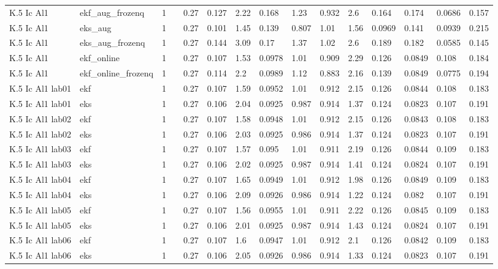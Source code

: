 \begin{table}[t]
\begin{tabular}{lllllllllllllll}
K.5 Ic Al1 & ekf\_aug\_frozenq & 1 &  & 0.27 & 0.127 & 2.22 & 0.168 & 1.23 & 0.932 & 2.6 & 0.164 & 0.174 & 0.0686 & 0.157 \\
K.5 Ic Al1 & eks\_aug & 1 &  & 0.27 & 0.101 & 1.45 & 0.139 & 0.807 & 1.01 & 1.56 & 0.0969 & 0.141 & 0.0939 & 0.215 \\
K.5 Ic Al1 & eks\_aug\_frozenq & 1 &  & 0.27 & 0.144 & 3.09 & 0.17 & 1.37 & 1.02 & 2.6 & 0.189 & 0.182 & 0.0585 & 0.145 \\
K.5 Ic Al1 & ekf\_online & 1 &  & 0.27 & 0.107 & 1.53 & 0.0978 & 1.01 & 0.909 & 2.29 & 0.126 & 0.0849 & 0.108 & 0.184 \\
K.5 Ic Al1 & ekf\_online\_frozenq & 1 &  & 0.27 & 0.114 & 2.2 & 0.0989 & 1.12 & 0.883 & 2.16 & 0.139 & 0.0849 & 0.0775 & 0.194 \\
K.5 Ic Al1 lab01 & ekf & 1 &  & 0.27 & 0.107 & 1.59 & 0.0952 & 1.01 & 0.912 & 2.15 & 0.126 & 0.0844 & 0.108 & 0.183 \\
K.5 Ic Al1 lab01 & eks & 1 &  & 0.27 & 0.106 & 2.04 & 0.0925 & 0.987 & 0.914 & 1.37 & 0.124 & 0.0823 & 0.107 & 0.191 \\
K.5 Ic Al1 lab02 & ekf & 1 &  & 0.27 & 0.107 & 1.58 & 0.0948 & 1.01 & 0.912 & 2.15 & 0.126 & 0.0843 & 0.108 & 0.183 \\
K.5 Ic Al1 lab02 & eks & 1 &  & 0.27 & 0.106 & 2.03 & 0.0925 & 0.986 & 0.914 & 1.37 & 0.124 & 0.0823 & 0.107 & 0.191 \\
K.5 Ic Al1 lab03 & ekf & 1 &  & 0.27 & 0.107 & 1.57 & 0.095 & 1.01 & 0.911 & 2.19 & 0.126 & 0.0844 & 0.109 & 0.183 \\
K.5 Ic Al1 lab03 & eks & 1 &  & 0.27 & 0.106 & 2.02 & 0.0925 & 0.987 & 0.914 & 1.41 & 0.124 & 0.0824 & 0.107 & 0.191 \\
K.5 Ic Al1 lab04 & ekf & 1 &  & 0.27 & 0.107 & 1.65 & 0.0949 & 1.01 & 0.912 & 1.98 & 0.126 & 0.0849 & 0.109 & 0.183 \\
K.5 Ic Al1 lab04 & eks & 1 &  & 0.27 & 0.106 & 2.09 & 0.0926 & 0.986 & 0.914 & 1.22 & 0.124 & 0.082 & 0.107 & 0.191 \\
K.5 Ic Al1 lab05 & ekf & 1 &  & 0.27 & 0.107 & 1.56 & 0.0955 & 1.01 & 0.911 & 2.22 & 0.126 & 0.0845 & 0.109 & 0.183 \\
K.5 Ic Al1 lab05 & eks & 1 &  & 0.27 & 0.106 & 2.01 & 0.0925 & 0.987 & 0.914 & 1.43 & 0.124 & 0.0824 & 0.107 & 0.191 \\
K.5 Ic Al1 lab06 & ekf & 1 &  & 0.27 & 0.107 & 1.6 & 0.0947 & 1.01 & 0.912 & 2.1 & 0.126 & 0.0842 & 0.109 & 0.183 \\
K.5 Ic Al1 lab06 & eks & 1 &  & 0.27 & 0.106 & 2.05 & 0.0926 & 0.986 & 0.914 & 1.33 & 0.124 & 0.0823 & 0.107 & 0.191 \\

\end{tabular}
\end{table}
